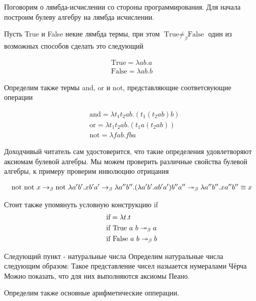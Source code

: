\documentclass[lambda.tex]{subfiles}
\begin{document}
\newcommand{\mmnot}{\text{not}}
\newcommand{\mmand}{\text{and}}
\newcommand{\mmor}{\text{or}}
\newcommand{\mmif}{\text{if}}
\newcommand{\mmt}{\text{True}}
\newcommand{\mmf}{\text{False}}

Поговорим о лямбда-исчислении со стороны программирования. Для начала построим булеву алгебру на лямбда исчислении.

Пусть True и False некие лямбда термы, при этом $\mmt \neq_\beta \mmf$ один из возможных способов сделать это следующий

\begin{align*}
\mmt = \lambda a b.a\\
\mmf = \lambda a b.b
\end{align*}

Определим также термы and, or и not, представляющие соответсвующие операции

\begin{align*}
&\mmand = \lambda t_1 t_2 a b . (t_1 (t_2 a b) b)\\
&\mmor = \lambda t_1 t_2 a b.(t_1 a (t_2 a b))\\
&\mmnot = \lambda f a b . f b a
\end{align*}

Доходчивый читатель сам удостоверится, что такие определения удовлетворяют аксиомам булевой алгебры.
Мы можем проверить различные свойства булевой алгебры, к примеру проверим инволюцию отрицания

\begin{align*}
	\mmnot\ \mmnot\ x \rb
	\mmnot\ \lambda a' b' . x b' a' \rb
	\lambda a'' b'' . (\lambda a' b' . a b' a') b'' a'' \rbm
	\lambda a'' b'' . x a'' b'' \equiv x
\end{align*}

Стоит также упомянуть условную конструкцию if
\begin{align*}
&\mmif = \lambda t. t\\
&\mmif\ \mmt\ a\ b \rbm a\\
&\mmif\ \mmf\ a\ b \rbm b\\
\end{align*}

Следующий пункт - натуральные числа
Определим натуральные числа следующим образом:
Такое представление чисел назыается нумералами Чёрча
Можно показать, что для них выполняются аксиомы Пеано.

Определим также основные арифметические опперации. 
\end{document}
